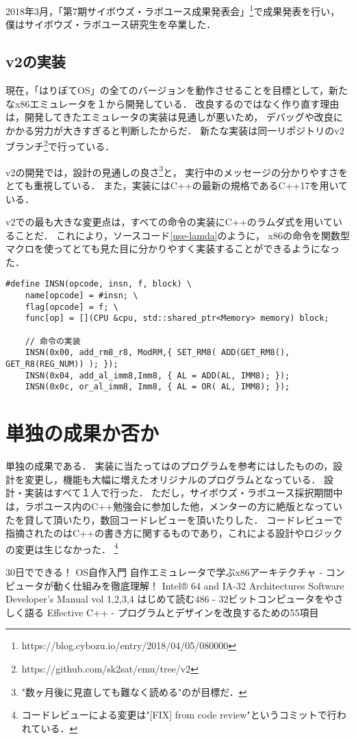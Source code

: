 \documentclass[10pt,a4j]{jsarticle}
\begin{document}
2018年3月，「第7期サイボウズ・ラボユース成果発表会」\footnote{https://blog.cybozu.io/entry/2018/04/05/080000}で成果発表を行い，
僕はサイボウズ・ラボユース研究生を卒業した．

\subsection{v2の実装}

現在，「はりぼてOS」の全てのバージョンを動作させることを目標として，新たなx86エミュレータを１から開発している．
改良するのではなく作り直す理由は，開発してきたエミュレータの実装は見通しが悪いため，
デバッグや改良にかかる労力が大きすぎると判断したからだ．
新たな実装は同一リポジトリのv2ブランチ\footnote{https://github.com/sk2sat/emu/tree/v2}で行っている．

v2の開発では，設計の見通しの良さ\footnote{"数ヶ月後に見直しても難なく読める"のが目標だ．}と，
実行中のメッセージの分かりやすさをとても重視している．
また，実装にはC++の最新の規格であるC++17を用いている．

v2での最も大きな変更点は，すべての命令の実装にC++のラムダ式を用いていることだ．
これにより，ソースコード\ref{use-lamda}のように，
x86の命令を関数型マクロを使ってとても見た目に分かりやすく実装することができるようになった．

\begin{lstlisting}[caption=ラムダ式を使った命令の実装,label=use-lamda]
#define INSN(opcode, insn, f, block) \
	name[opcode] = #insn; \
	flag[opcode] = f; \
	func[op] = [](CPU &cpu, std::shared_ptr<Memory> memory) block;

	// 命令の実装
	INSN(0x00, add_rm8_r8, ModRM,{ SET_RM8( ADD(GET_RM8(), GET_R8(REG_NUM)) ); });
	INSN(0x04, add_al_imm8,Imm8, { AL = ADD(AL, IMM8); });
	INSN(0x0c, or_al_imm8, Imm8, { AL = OR( AL, IMM8); });
\end{lstlisting}

\section{単独の成果か否か}
単独の成果である．
実装に当たっては\cite{learn-x86-by-emu}のプログラムを参考にはしたものの，設計を変更し，機能も大幅に増えたオリジナルのプログラムとなっている．
設計・実装はすべて１人で行った．
ただし，サイボウズ・ラボユース採択期間中は，ラボユース内のC++勉強会に参加した他，メンターの方に絶版となっていた\cite{read-486}を貸して頂いたり，数回コードレビューを頂いたりした．
コードレビューで指摘されたのはC++の書き方に関するものであり，これによる設計やロジックの変更は生じなかった．
\footnote{コードレビューによる変更は"[FIX] from code review"というコミットで行われている．}


\begin{thebibliography}{99}
	 30日でできる！ OS自作入門
	 自作エミュレータで学ぶx86アーキテクチャ - コンピュータが動く仕組みを徹底理解！
	\bibitem{SDM} Intel® 64 and IA-32 Architectures Software Developer’s Manual vol 1,2,3,4
	\bibitem{read-486} はじめて読む486 - 32ビットコンピュータをやさしく語る
	\bibitem{effective-cpp} Effective C++ - プログラムとデザインを改良するための55項目
\end{thebibliography}
\end{document}

